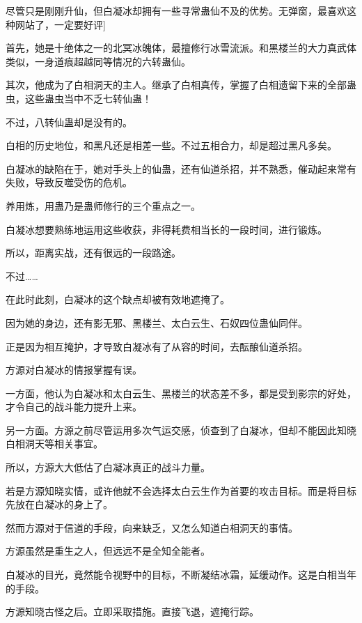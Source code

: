 
\begin{this_body}

尽管只是刚刚升仙，但白凝冰却拥有一些寻常蛊仙不及的优势。无弹窗，最喜欢这种网站了，一定要好评]

首先，她是十绝体之一的北冥冰魄体，最擅修行冰雪流派。和黑楼兰的大力真武体类似，一身道痕超越同等情况的六转蛊仙。

其次，他成为了白相洞天的主人。继承了白相真传，掌握了白相遗留下来的全部蛊虫，这些蛊虫当中不乏七转仙蛊！

不过，八转仙蛊却是没有的。

白相的历史地位，和黑凡还是相差一些。不过五相合力，却是超过黑凡多矣。

白凝冰的缺陷在于，她对手头上的仙蛊，还有仙道杀招，并不熟悉，催动起来常有失败，导致反噬受伤的危机。

养用炼，用蛊乃是蛊师修行的三个重点之一。

白凝冰想要熟练地运用这些收获，非得耗费相当长的一段时间，进行锻炼。

所以，距离实战，还有很远的一段路途。

不过……

在此时此刻，白凝冰的这个缺点却被有效地遮掩了。

因为她的身边，还有影无邪、黑楼兰、太白云生、石奴四位蛊仙同伴。

正是因为相互掩护，才导致白凝冰有了从容的时间，去酝酿仙道杀招。

方源对白凝冰的情报掌握有误。

一方面，他认为白凝冰和太白云生、黑楼兰的状态差不多，都是受到影宗的好处，才令自己的战斗能力提升上来。

另一方面。方源之前尽管运用多次气运交感，侦查到了白凝冰，但却不能因此知晓白相洞天等相关事宜。

所以，方源大大低估了白凝冰真正的战斗力量。

若是方源知晓实情，或许他就不会选择太白云生作为首要的攻击目标。而是将目标先放在白凝冰的身上了。

然而方源对于信道的手段，向来缺乏，又怎么知道白相洞天的事情。

方源虽然是重生之人，但远远不是全知全能者。

白凝冰的目光，竟然能令视野中的目标，不断凝结冰霜，延缓动作。这是白相当年的手段。

方源知晓古怪之后。立即采取措施。直接飞退，遮掩行踪。


\end{this_body}
